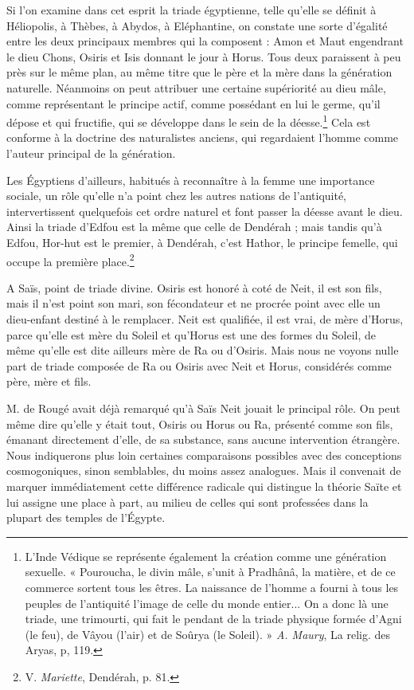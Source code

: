\documentclass[a4paper, 11pt, oneside]{article}
\begin{document}
Si l'on examine dans cet esprit la triade égyptienne, telle qu'elle se définit à Héliopolis, à Thèbes, à Abydos, à Eléphantine, on constate une sorte d'égalité entre les deux principaux membres qui la composent : Amon et Maut engendrant le dieu Chons, Osiris et Isis donnant le jour à Horus. Tous deux paraissent à peu près sur le même plan, au même titre que le père et la mère dans la génération naturelle. Néanmoins on peut attribuer une certaine supériorité au dieu mâle, comme représentant le principe actif, comme possédant en lui le germe, qu'il dépose et qui fructifie, qui se développe dans le sein de la déesse.\footnote{L'Inde Védique se représente également la création comme une génération sexuelle. « Pouroucha, le divin mâle, s'unit à Pradhânâ, la matière, et de ce commerce sortent tous les êtres. La naissance de l'homme a fourni à tous les peuples de l'antiquité l'image de celle du monde entier... On a donc là une triade, une trimourti, qui fait le pendant de la triade physique formée d'Agni (le feu), de Vâyou (l'air) et de Soûrya (le Soleil). » \emph{A. Maury}, La relig. des Aryas, p, 119.} Cela est conforme à la doctrine des naturalistes anciens, qui regardaient l'homme comme l'auteur principal de la génération.

Les Égyptiens d'ailleurs, habitués à reconnaître à la femme une importance sociale, un rôle qu'elle n'a point chez les autres nations de l'antiquité, intervertissent quelquefois cet ordre naturel et font passer la déesse avant le dieu. Ainsi la triade d'Edfou est la même que celle de Dendérah ; mais tandis qu'à Edfou, Hor-hut est le premier, à Dendérah, c'est Hathor, le principe femelle, qui occupe la première place.\footnote{V. \emph{Mariette}, Dendérah, p. 81.}

A Saïs, point de triade divine. Osiris est honoré à coté de Neit, il est son fils, mais il n'est point son mari, son fécondateur et ne procrée point avec elle un dieu-enfant destiné à le remplacer. Neit est qualifiée, il est vrai, de mère d'Horus, parce qu’elle est mère du Soleil et qu'Horus est une des formes du Soleil, de même qu'elle est dite ailleurs mère de Ra ou d'Osiris. Mais nous ne voyons nulle part de triade composée de Ra ou Osiris avec Neit et Horus, considérés comme père, mère et fils.

M. de Rougé avait déjà remarqué qu'à Saïs Neit jouait le principal rôle. On peut même dire qu'elle y était tout, Osiris ou Horus ou Ra, présenté comme son fils, émanant directement d'elle, de sa substance, sans aucune intervention étrangère. Nous indiquerons plus loin certaines comparaisons possibles avec des conceptions cosmogoniques, sinon semblables, du moins assez analogues. Mais il convenait de marquer immédiatement cette différence radicale qui distingue la théorie Saïte et lui assigne une place à part, au milieu de celles qui sont professées dans la plupart des temples de l'Égypte.
\end{document}
